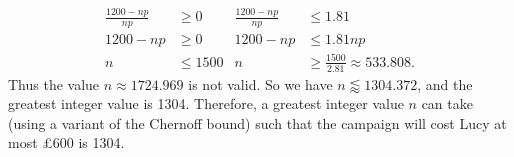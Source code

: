 \begin{solution}
\begin{align*}
        \frac{1200-np}{np} & \geq 0    & \tfrac{1200-np}{np} & \leq 1.81              \\
        1200-np            & \geq 0    & 1200-np             & \leq 1.81np            \\
        n                  & \leq 1500 & n                   & \geq \frac{1500}{2.81} \approx 533.808.
    \end{align*}
    Thus the value $n \approx 1724.969$ is not valid. So we have $n \lessapprox 1304.372$, and the greatest integer value is \num{1304}. Therefore, a greatest integer value $n$ can take (using a variant of the Chernoff bound) such that the campaign will cost Lucy at most £600 is \num{1304}.
\end{solution}